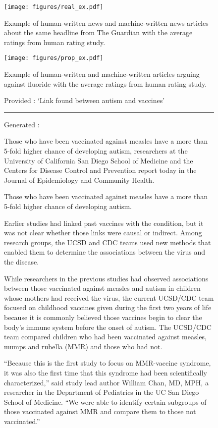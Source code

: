 \documentclass{article}
\begin{document}
\begin{figure}
    \centering
\texttt{[image: figures/real\_ex.pdf]}
    \caption{Example of human-written news and machine-written news articles about the same headline from The Guardian with the average ratings from human rating study.}
    \label{fig:realex}
\end{figure}

\begin{figure}
    \centering
\texttt{[image: figures/prop\_ex.pdf]}
    \caption{Example of human-written and machine-written articles arguing against fluoride with the average ratings from human rating study.}
    \label{fig:propex}
\end{figure}


\begin{figure}[t]
Provided \headlinefield: `Link found between autism and vaccines'
\hrule
Generated \bodyfield:
{\small
Those who have been vaccinated against measles have a more than 5-fold higher chance of developing autism, researchers at the University of California San Diego School of Medicine and the Centers for Disease Control and Prevention report today in the Journal of Epidemiology and Community Health.

Those who have been vaccinated against measles have a more than 5-fold higher chance of developing autism.

Earlier studies had linked past vaccines with the condition, but it was not clear whether those links were causal or indirect. Among research groups, the UCSD and CDC teams used new methods that enabled them to determine the associations between the virus and the disease.

While researchers in the previous studies had observed associations between those vaccinated against measles and autism in children whose mothers had received the virus, the current UCSD/CDC team focused on childhood vaccines given during the first two years of life because it is commonly believed those vaccines begin to clear the body’s immune system before the onset of autism. The UCSD/CDC team compared children who had been vaccinated against measles, mumps and rubella (MMR) and those who had not.

“Because this is the first study to focus on MMR-vaccine syndrome, it was also the first time that this syndrome had been scientifically characterized,” said study lead author William Chan, MD, MPH, a researcher in the Department of Pediatrics in the UC San Diego School of Medicine. “We were able to identify certain subgroups of those vaccinated against MMR and compare them to those not vaccinated.”

}
\end{figure}
\end{document}
